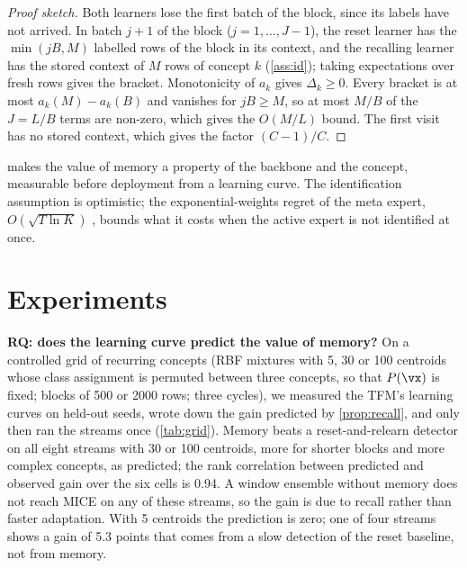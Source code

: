 \documentclass{article}
\theoremstyle{plain}
\theoremstyle{definition}
\theoremstyle{remark}
\newcommand{\method}{\textsc{MICE}}   %
\begin{document}
\begin{proof}[Proof sketch]
Both learners lose the first batch of the block, since its labels have not arrived. In batch $j+1$ of the block
($j=1,\dots,J-1$), the reset learner has the $\min(jB,M)$ labelled rows of the block in its context, and the recalling
learner has the stored context of $M$ rows of concept $k$ (\cref{ass:id}); taking expectations over fresh rows gives
the bracket. Monotonicity of $a_k$ gives $\Delta_k\ge0$. Every bracket is at most $a_k(M)-a_k(B)$ and vanishes for
$jB\ge M$, so at most $M/B$ of the $J=L/B$ terms are non-zero, which gives the $O(M/L)$ bound. The first visit has
no stored context, which gives the factor $(C-1)/C$.
\end{proof}

 makes the value of memory a property of the backbone and the concept, measurable before deployment
from a learning curve. The identification assumption is optimistic; the exponential-weights regret of the meta
expert, $O(\sqrt{T\ln K})$ \citep{zhao2025mooe}, bounds what it costs when the active expert is not identified at
once.

\section{Experiments}
\label{sec:exp}

\textbf{RQ: does the learning curve predict the value of memory?} On a controlled grid of recurring concepts (RBF
mixtures with 5, 30 or 100 centroids whose class assignment is permuted between three concepts, so that $P(\vx)$ is
fixed; blocks of 500 or 2000 rows; three cycles), we measured the TFM's learning curves on held-out seeds, wrote down
the gain predicted by \cref{prop:recall}, and only then ran the streams once (\cref{tab:grid}). Memory beats a
reset-and-relearn detector on all eight streams with 30 or 100 centroids, more for shorter blocks and more complex
concepts, as predicted; the rank correlation between predicted and observed gain over the six cells is 0.94. A
window ensemble without memory does not reach \method{} on any of these streams, so the gain is due to recall rather
than faster adaptation. With 5 centroids the prediction is zero; one of four streams shows a gain of 5.3 points that
comes from a slow detection of the reset baseline, not from memory.
\end{document}
